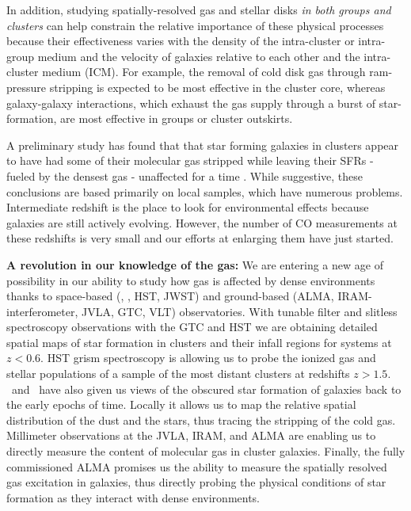 \documentclass[11pt]{article}
\begin{document}
In addition, studying spatially-resolved gas and stellar disks {\em in
  both groups and clusters} can help constrain the relative importance
of these physical processes because their effectiveness varies with
the density of the intra-cluster or intra-group medium and the
velocity of galaxies relative to each other and the intra-cluster
medium (ICM).  For example, the removal of cold disk gas through
ram-pressure stripping is expected to be most effective in the cluster
core, whereas galaxy-galaxy interactions, which exhaust the gas supply
through a burst of star-formation, are most effective in groups or
cluster outskirts.

A preliminary study has found that that star forming galaxies in
clusters appear to have had some of their molecular gas stripped while
leaving their SFRs - fueled by the densest gas - unaffected for a time
\citep{Jablonka13}.  While suggestive, these conclusions are based
primarily on local samples, which have numerous problems.
Intermediate redshift is the place to look for environmental effects
because galaxies are still actively evolving.  However, the number of
CO measurements at these redshifts is very small and our efforts at
enlarging them have just started.  


\textbf{A revolution in our knowledge of the gas:} We are entering a
new age of possibility in our ability to study how gas is affected by
dense environments thanks to space-based (\spitzer, \herschel, HST,
JWST) and ground-based (ALMA, IRAM-interferometer, JVLA, GTC, VLT)
observatories.  With tunable filter and slitless spectroscopy
observations with the GTC and HST we are obtaining detailed spatial
maps of star formation in clusters and their infall regions for
systems at $z<0.6$.  HST grism spectroscopy is allowing us to probe
the ionized gas and stellar populations of a sample of the most
distant clusters at redshifts $z>1.5$.  \spitzer\ and \herschel\ have
also given us views of the obscured star formation of galaxies back to
the early epochs of time.  Locally it allows us to map the relative
spatial distribution of the dust and the stars, thus tracing the
stripping of the cold gas.  Millimeter observations at the JVLA, IRAM,
and ALMA are enabling us to directly measure the content of molecular
gas in cluster galaxies.  Finally, the fully commissioned ALMA promises us
the ability to measure the spatially resolved gas excitation in
galaxies, thus directly probing the physical conditions of star
formation as they interact with dense environments.
\end{document}
